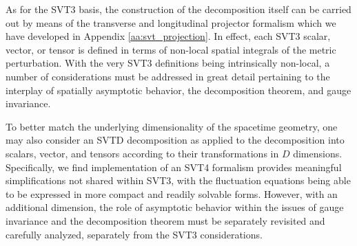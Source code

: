 As for the SVT3 basis, the construction of the decomposition itself can be carried out by means of the transverse and longitudinal projector formalism which we have developed in Appendix \ref{aa:svt_projection}. In effect, each SVT3 scalar, vector, or tensor is defined in terms of non-local spatial integrals of the metric perturbation. With the very SVT3 definitions being intrinsically non-local, a number of considerations must be addressed in great detail pertaining to the interplay of spatially asymptotic behavior, the decomposition theorem, and gauge invariance. 

To better match the underlying dimensionality of the spacetime geometry, one may also consider an SVTD decomposition as applied to the decomposition into scalars, vector, and tensors according to their transformations in $D$ dimensions. Specifically, we find implementation of an SVT4 formalism provides meaningful simplifications not shared within SVT3, with the fluctuation equations being able to be expressed in more compact and readily solvable forms. However, with an additional dimension, the role of asymptotic behavior within the issues of gauge invariance and the decomposition theorem must be separately revisited and carefully analyzed, separately from the SVT3 considerations. 

